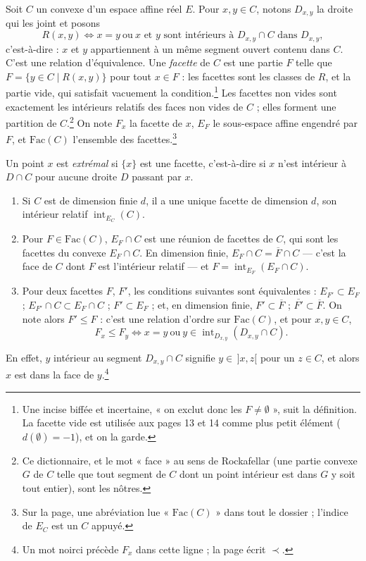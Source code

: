 \documentclass[11pt,a4paper]{article}
\begin{document}
Soit $C$ un convexe d'un espace affine réel $E$. Pour $x, y \in C$, notons
$D_{x,y}$ la droite qui les joint et posons
\[
  R(x,y) \iff x = y \ \text{ou} \ x \text{ et } y \text{ sont intérieurs à }
  D_{x,y} \cap C \text{ dans } D_{x,y},
\]
c'est-à-dire : $x$ et $y$ appartiennent à un même segment ouvert contenu dans
$C$. C'est une relation d'équivalence. Une \emph{facette} de $C$ est une partie
$F$ telle que $F = \{y \in C \mid R(x,y)\}$ pour tout $x \in F$ : les facettes
sont les classes de $R$, et la partie vide, qui satisfait vacuement la
condition.\footnote{Une incise biffée et incertaine, « on exclut donc les $F \neq
\emptyset$ », suit la définition. La facette vide est utilisée aux pages 13 et
14 comme plus petit élément ($d(\emptyset) = -1$), et on la garde.} Les facettes
non vides sont exactement les intérieurs relatifs des faces non vides de
$C$ ; elles forment une partition de $C$.\footnote{Ce dictionnaire, et le mot
« face » au sens de Rockafellar (une partie convexe $G$ de $C$ telle que tout
segment de $C$ dont un point intérieur est dans $G$ y soit tout entier), sont
les nôtres.} On note $F_{x}$ la facette de $x$, $E_{F}$ le sous-espace affine
engendré par $F$, et $\mathrm{Fac}(C)$ l'ensemble des facettes.\footnote{Sur la
page, une abréviation lue « $\mathrm{Fac}(C)$ » dans tout le dossier ; l'indice
de $E_{C}$ est un $C$ appuyé.}

Un point $x$ est \emph{extrémal} si $\{x\}$ est une facette, c'est-à-dire si $x$
n'est intérieur à $D \cap C$ pour aucune droite $D$ passant par
$x$.

\begin{enumerate}
\item[(1)] Si $C$ est de dimension finie $d$, il a une unique facette de
dimension $d$, son intérieur relatif $\operatorname{int}_{E_{C}}(C)$.
\item[(2)] Pour $F \in \mathrm{Fac}(C)$, $E_{F} \cap C$ est une réunion de
facettes de $C$, qui sont les facettes du convexe $E_{F} \cap C$. En dimension
finie, $E_{F} \cap C = \overline{F} \cap C$ --- c'est la face de $C$ dont $F$
est l'intérieur relatif --- et $F = \operatorname{int}_{E_{F}}(E_{F} \cap C)$.
\item[(3)] Pour deux facettes $F$, $F'$, les conditions suivantes sont
équivalentes : $E_{F'} \subset E_{F}$ ; $E_{F'} \cap C \subset E_{F} \cap C$ ;
$F' \subset E_{F}$ ; et, en dimension finie, $F' \subset \overline{F}$ ;
$\overline{F'} \subset \overline{F}$. On note alors $F' \leq F$ : c'est une
relation d'ordre sur $\mathrm{Fac}(C)$, et pour $x, y \in C$,
\[
  F_{x} \leq F_{y} \iff x = y \ \text{ou} \ y \in
  \operatorname{int}_{D_{x,y}}(D_{x,y} \cap C).
\]
\end{enumerate}
En effet, $y$ intérieur au segment $D_{x,y} \cap C$ signifie $y \in \,]x,z[$
pour un $z \in C$, et alors $x$ est dans la face de $y$.\footnote{Un mot noirci
précède $F_{x}$ dans cette ligne ; la page écrit $\prec$.}
\end{document}
